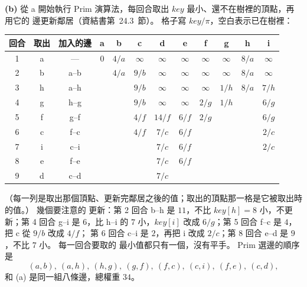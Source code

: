 \begin{pastsoln}
\textbf{(b)} 從 a 開始執行 Prim 演算法，每回合取出 $\mathit{key}$ 最小、還不在樹裡的頂點，再用它的
邊更新鄰居（資結書第~24.3~節）。 格子寫 $\mathit{key}/\pi$，空白表示已在樹裡：
\begin{center}
\small
\setlength{\tabcolsep}{4pt}
\begin{tabular}{ccc*{9}{c}}
\toprule
回合 & 取出 & 加入的邊 & a & b & c & d & e & f & g & h & i \\
\midrule
1 & a & — & $0$ & $4/a$ & $\infty$ & $\infty$ & $\infty$ & $\infty$ & $\infty$ & $8/a$ & $\infty$ \\
2 & b & a--b & & $4/a$ & $9/b$ & $\infty$ & $\infty$ & $\infty$ & $\infty$ & $8/a$ & $\infty$ \\
3 & h & a--h & & & $9/b$ & $\infty$ & $\infty$ & $\infty$ & $1/h$ & $8/a$ & $7/h$ \\
4 & g & h--g & & & $9/b$ & $\infty$ & $\infty$ & $2/g$ & $1/h$ & & $6/g$ \\
5 & f & g--f & & & $4/f$ & $14/f$ & $6/f$ & $2/g$ & & & $6/g$ \\
6 & c & f--c & & & $4/f$ & $7/c$ & $6/f$ & & & & $2/c$ \\
7 & i & c--i & & & & $7/c$ & $6/f$ & & & & $2/c$ \\
8 & e & f--e & & & & $7/c$ & $6/f$ & & & & \\
9 & d & c--d & & & & $7/c$ & & & & & \\
\bottomrule
\end{tabular}
\end{center}
（每一列是取出那個頂點、更新完鄰居之後的值；取出的頂點那一格是它被取出時的值。） 幾個要注意的
更新：第 2 回合 b--h 是 $11$，不比 $\mathit{key}[h] = 8$ 小，不更新；第 4 回合 g--i 是 $6$，比
h--i 的 $7$ 小，$\mathit{key}[i]$ 改成 $6/g$；第 5 回合 f--c 是 $4$，把 c 從 $9/b$ 改成 $4/f$；
第 6 回合 c--i 是 $2$，再把 i 改成 $2/c$；第 8 回合 e--d 是 $9$，不比 $7$ 小。 每一回合要取的
最小值都只有一個，沒有平手。 Prim 選邊的順序是
\[
(a, b),\ (a, h),\ (h, g),\ (g, f),\ (f, c),\ (c, i),\ (f, e),\ (c, d),
\]
和 (a) 是同一組八條邊，總權重 $34$。
\end{pastsoln}
